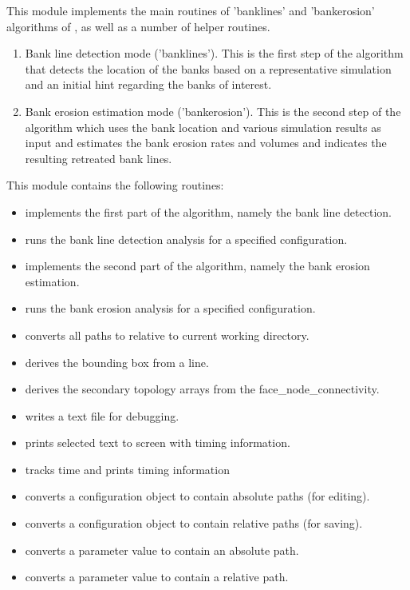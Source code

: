 This module implements the main routines of 'banklines' and 'bankerosion' algorithms of \dfastbe, as well as a number of helper routines.

\begin{enumerate}
\item Bank line detection mode ('banklines').
This is the first step of the algorithm that detects the location of the banks based on a representative \dflowfm simulation and an initial hint regarding the banks of interest.
\item Bank erosion estimation mode ('bankerosion').
This is the second step of the algorithm which uses the bank location and various \dflowfm simulation results as input and estimates the bank erosion rates and volumes and indicates the resulting retreated bank lines.
\end{enumerate}

This module contains the following routines:

\begin{itemize}
\item {} implements the first part of the algorithm, namely the bank line detection.
\item {} runs the bank line detection analysis for a specified configuration.
\item {} implements the second part of the algorithm, namely the bank erosion estimation.
\item {} runs the bank erosion analysis for a specified configuration.

\item {} converts all paths to relative to current working directory.
\item {} derives the bounding box from a line.
\item {} derives the secondary topology arrays from the face\_node\_connectivity.
\item {} writes a text file for debugging.
\item {} prints selected text to screen with timing information.
\item {} tracks time and prints timing information
\item {} converts a configuration object to contain absolute paths (for editing).
\item {} converts a configuration object to contain relative paths (for saving).
\item {} converts a parameter value to contain an absolute path.
\item {} converts a parameter value to contain a relative path.
\end{itemize}

